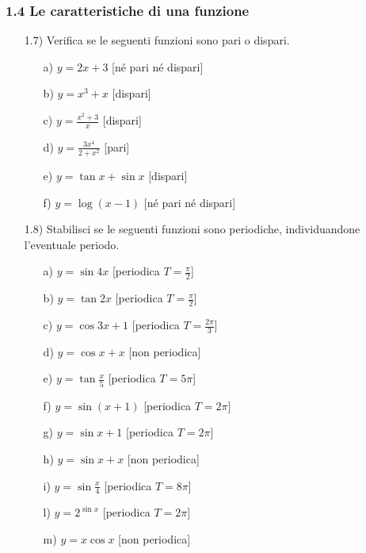 \subsubsection*{1.4 Le caratteristiche di una funzione}
\begin{itemize}
  \item[1.7)] Verifica se le seguenti funzioni sono pari o dispari.
  \begin{itemize}
  \item[a)] $y=2x+3$   \hfill   
  [né pari né dispari]
  \item[b)] $y=x^3+x$   \hfill  
   [dispari]
  \item[c)] $y=\frac{x^2+3}{x}$   \hfill  
  [dispari]
  \item[d)] $y=\frac{3x^4}{2+x^2} $   \hfill  
   [pari]
  \item[e)] $y=\tan{x}+\sin{x} $   \hfill   
 [dispari]
  \item[f)] $y= \log{(x-1)}$   \hfill   
[né pari né dispari]
  \end{itemize}
  
  \item[1.8)] Stabilisci se le seguenti funzioni sono periodiche, 
individuandone l'eventuale periodo.
  \begin{itemize}
  \item[a)] $y=\sin4x$   \hfill   
  [periodica $T=\frac{\pi}{2}$]
  \item[b)] $y=\tan2x$   \hfill   
  [periodica $T=\frac{\pi}{2}$]
  \item[c)] $y=\cos3x+1$   \hfill   
   [periodica $T=\frac{2\pi}{3}$]
  \item[d)] $y=\cos x+x $   \hfill  
   [non periodica]
  \item[e)] $y=\tan{\frac{x}{5}} $   \hfill   
   [periodica $T=5\pi$]
  \item[f)] $y= \sin(x+1)$   \hfill   
[periodica $T=2\pi$]
  \item[g)] $y= \sin x+1$   \hfill   
[periodica $T=2\pi$]
  \item[h)] $y= \sin x+x$   \hfill   
[non periodica]
  \item[i)] $y= \sin{\frac{x}{4}}$   \hfill   
  [periodica $T=8\pi$]
  \item[l)] $y= 2^{\sin{x}}$   \hfill   
[periodica $T=2\pi$]
  \item[m)] $y=x\cos x$   \hfill   [non 
periodica]
  \end{itemize}
\end{itemize}

